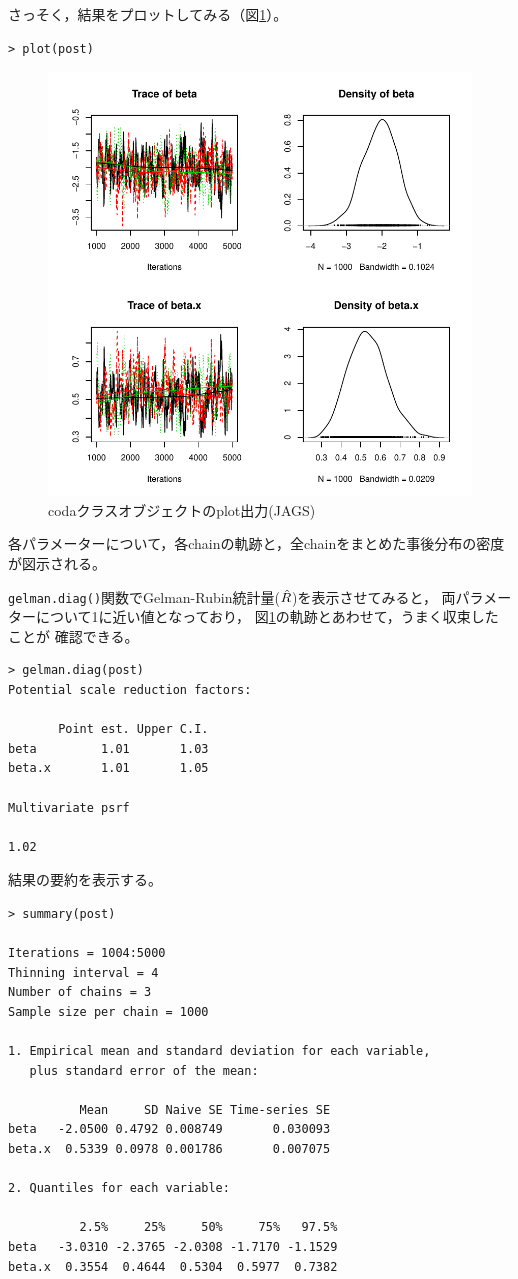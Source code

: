 \documentclass[11pt,uplatex]{jsarticle}
\begin{document}
さっそく，結果をプロットしてみる（図\ref{plot_coda}）。
\begin{lstlisting}
> plot(post)
\end{lstlisting}


\begin{figure}[htbp]
	\begin{center}
		\includegraphics[bb=0 0 400 400, clip, width=300 bp]{example2_jags_results.pdf}
	\end{center}
	\caption{\textsf{coda}クラスオブジェクトのplot出力(JAGS)}
	\label{plot_coda}
\end{figure}
\noindent
各パラメーターについて，各chainの軌跡と，全chainをまとめた事後分布の密度が図示される。

\texttt{gelman.diag()}関数でGelman-Rubin統計量($\Hat{R}$)を表示させてみると，
両パラメーターについて1に近い値となっており，
図\ref{plot_coda}の軌跡とあわせて，うまく収束したことが
確認できる。
\begin{lstlisting}
> gelman.diag(post)
Potential scale reduction factors:

       Point est. Upper C.I.
beta         1.01       1.03
beta.x       1.01       1.05

Multivariate psrf

1.02
\end{lstlisting}


結果の要約を表示する。
\begin{lstlisting}
> summary(post)

Iterations = 1004:5000
Thinning interval = 4 
Number of chains = 3 
Sample size per chain = 1000 

1. Empirical mean and standard deviation for each variable,
   plus standard error of the mean:

          Mean     SD Naive SE Time-series SE
beta   -2.0500 0.4792 0.008749       0.030093
beta.x  0.5339 0.0978 0.001786       0.007075

2. Quantiles for each variable:

          2.5%     25%     50%     75%   97.5%
beta   -3.0310 -2.3765 -2.0308 -1.7170 -1.1529
beta.x  0.3554  0.4644  0.5304  0.5977  0.7382

\end{lstlisting}
\end{document}
